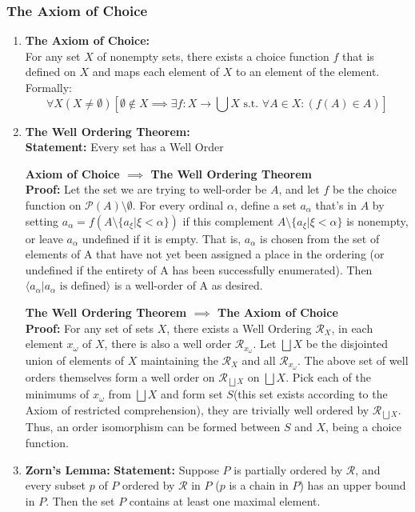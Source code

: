 \documentclass{article}
\newcommand{\0}{{\bf{0}}}
\begin{document}
\subsubsection{The Axiom of Choice}
\begin{enumerate}
    \item \textbf{The Axiom of Choice:}\\
    For any set $X$ of nonempty sets, there exists a choice function $f$ that is defined on $X$ and maps each element of $X$ to an element of the element. Formally:
    $$\forall X(X\neq\emptyset)\left[\emptyset\notin X\implies\exists f:X\to\bigcup X\mbox{ s.t. }\forall A\in X:(f(A)\in A)\right]$$
    \item \textbf{The Well Ordering Theorem:}\\
    \textbf{Statement:} Every set has a Well Order
    
    \textbf{Axiom of Choice $\implies$ The Well Ordering Theorem}\\
    \textbf{Proof:} Let the set we are trying to well-order be $A$, and let $f$ be the choice function on $\mathcal{P}(A)\setminus\emptyset$. For every ordinal $\alpha$, define a set $a_\alpha$ that's in $A$ by setting $a_\alpha =f(A\setminus\{a_{\xi}|\xi<\alpha\})$ if this complement $A\setminus\{a_{\xi }|\xi <\alpha\}$ is nonempty, or leave $a_\alpha$ undefined if it is empty. That is, $a_\alpha$ is chosen from the set of elements of A that have not yet been assigned a place in the ordering (or undefined if the entirety of A has been successfully enumerated). Then $\langle a_{\alpha }|a_{\alpha }{\text{ is defined}}\rangle$ is a well-order of A as desired.
    
    \textbf{The Well Ordering Theorem $\implies$ The Axiom of Choice}\\
    \textbf{Proof:} For any set of sets $X$, there exists a Well Ordering $\mathcal{R}_X$, in each element $x_\omega$ of $X$, there is also a well order $\mathcal{R}_{x_\omega}$. Let $\bigsqcup X$ be the disjointed union of elements of $X$ maintaining the $\mathcal{R}_X$ and all $\mathcal{R}_{x_\omega}$. The above set of well orders themselves form a well order on $\mathcal{R}_{\bigsqcup X}$ on $\bigsqcup X$. Pick each of the minimums of $x_\omega$ from $\bigsqcup X$ and form set $S$(this set exists according to the Axiom of restricted comprehension), they are trivially well ordered by $\mathcal{R}_{\bigsqcup X}$. Thus, an order isomorphism can be formed between $S$ and $X$, being a choice function.
    \item \textbf{Zorn's Lemma:}
    \textbf{Statement:} Suppose $P$ is partially ordered by $\mathcal{R}$, and every subset $p$ of $P$ ordered by $\mathcal{R}$ in $P$ ($p$ is a chain in $P$) has an upper bound in $P$. Then the set $P$ contains at least one maximal element.
    

\end{enumerate}
\end{document}
